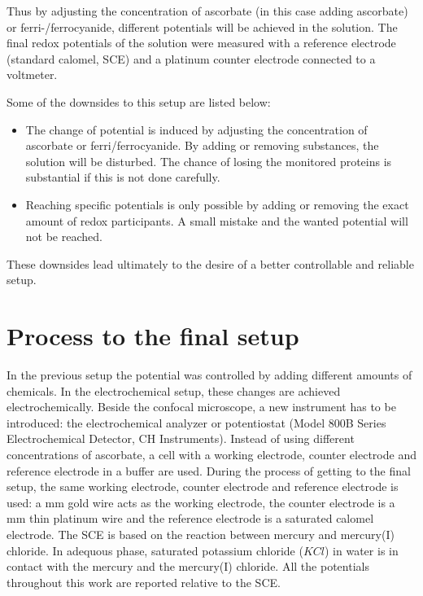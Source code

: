 \documentclass[twoside,single]{lion-msc}
\begin{document}
Thus by adjusting the concentration of ascorbate (in this case adding ascorbate) or ferri-/ferrocyanide, different potentials will be achieved in the solution. The final redox potentials of the solution were measured with a reference electrode (standard calomel, SCE) and a platinum counter electrode connected to a voltmeter.

Some of the downsides to this setup are listed below:
\begin{itemize}
\item The change of potential is induced by adjusting the concentration of ascorbate or ferri/ferrocyanide. By adding or removing substances, the solution will be disturbed. The chance of losing the monitored proteins is substantial if this is not done carefully. 
\item Reaching specific potentials is only possible by adding or removing the exact amount of redox participants. A small mistake and the wanted potential will not be reached. 
\end{itemize}

These downsides lead ultimately to the desire of a better controllable and reliable setup. 

\section{Process to the final setup}

In the previous setup the potential was controlled by adding different amounts of chemicals. In the electrochemical setup, these changes are achieved electrochemically. Beside the confocal microscope, a new instrument has to be introduced: the electrochemical analyzer or potentiostat (Model 800B Series Electrochemical Detector, CH Instruments). Instead of using different concentrations of ascorbate, a cell with a working electrode, counter electrode and reference electrode in a buffer are used. During the process of getting to the final setup, the same working electrode, counter electrode and reference electrode is used: a  mm gold wire acts as the working electrode, the counter electrode is a  mm thin platinum wire and the reference electrode is a saturated calomel electrode. The SCE is based on the reaction between mercury and mercury(I) chloride. In adequous phase, saturated potassium chloride ($KCl$) in water is in contact with the mercury and the mercury(I) chloride. All the potentials throughout this work are reported relative to the SCE.
\end{document}
